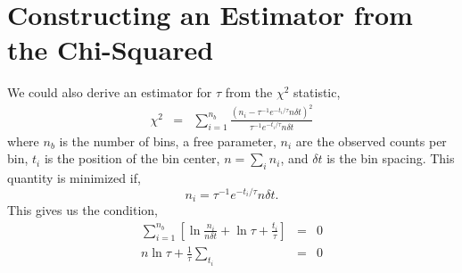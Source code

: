 \documentclass[12pt]{article}
\newcommand{\deriv}[3][]{%
  \ensuremath{\frac{\partial^{#1} {#2}}{\partial {#3}^{#1}}}}
\begin{document}
\section{Constructing an Estimator from the Chi-Squared}
We could also derive an estimator for $\tau$ from the $\chi^2$ statistic,
\begin{eqnarray}
\chi^2 &=& \sum_{i = 1}^{n_{b}} \frac{(n_i - \tau^{-1} e^{-t_i/ \tau} n \delta t)^2}{\tau^{-1} e^{-t_i/ \tau} n \delta t}
\end{eqnarray}
where $n_b$ is the number of bins, a free parameter, $n_i$ are the observed counts per bin, $t_i$ is the position of the bin center, $n = \sum_i n_i$, and $\delta t$ is the bin spacing.  This quantity is minimized if,
\begin{equation}
n_i = \tau^{-1} e^{-t_i/\tau}n \delta t.
\end{equation}
This gives us the condition,
\begin{eqnarray}
\sum_{i=1}^{n_b} \left[\ln \frac{n_i}{n \delta t} + \ln \tau + \frac{t_i}{\tau} \right]&=& 0\\
 n \ln \tau + \frac{1}{\tau} \sum_{t_i} &=& 0
\end{eqnarray}
\end{document}
